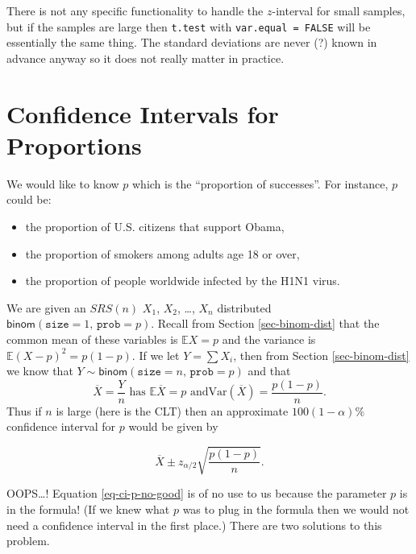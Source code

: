 \documentclass[]{book}
\providecommand{\tightlist}{%
  \setlength{\itemsep}{0pt}\setlength{\parskip}{0pt}}
\numberwithin{equation}{chapter}
\numberwithin{figure}{chapter}
\theoremstyle{plain}
\theoremstyle{definition}
\theoremstyle{remark}
\theoremstyle{definition}
\theoremstyle{definition}
\theoremstyle{remark}
\begin{document}
There is not any specific functionality to handle the \(z\)-interval for
small samples, but if the samples are large then \texttt{t.test} with
\texttt{var.equal\ =\ FALSE} will be essentially the same thing. The
standard deviations are never (?) known in advance anyway so it does not
really matter in practice.

\section{Confidence Intervals for
Proportions}\label{sec-confidence-intervals-proportions}

We would like to know \(p\) which is the ``proportion of successes''.
For instance, \(p\) could be:

\begin{itemize}
\tightlist
\item
  the proportion of U.S. citizens that support Obama,
\item
  the proportion of smokers among adults age 18 or over,
\item
  the proportion of people worldwide infected by the H1N1 virus.
\end{itemize}

We are given an \(SRS(n)\) \(X_{1}\), \(X_{2}\), \ldots{}, \(X_{n}\)
distributed \(\mathsf{binom}(\mathtt{size}=1,\,\mathtt{prob}=p)\).
Recall from Section \ref{sec-binom-dist} that the common mean of these
variables is \(\mathbb{E} X=p\) and the variance is
\(\mathbb{E}(X-p)^{2}=p(1-p)\). If we let \(Y=\sum X_{i}\), then from
Section \ref{sec-binom-dist} we know that
\(Y\sim\mathsf{binom}(\mathtt{size}=n,\,\mathtt{prob}=p)\) and that \[
\overline{X}=\frac{Y}{n}\mbox{ has }\mathbb{E}\overline{X}=p\mbox{ and
}\mathrm{Var}(\overline{X})=\frac{p(1-p)}{n}.  \] Thus if \(n\) is large
(here is the CLT) then an approximate \(100(1-\alpha)\%\) confidence
interval for \(p\) would be given by

\begin{equation}
\label{eq-ci-p-no-good}
\overline{X}\pm z_{\alpha/2}\sqrt{\frac{p(1-p)}{n}}.
\end{equation}

OOPS\ldots{}! Equation \eqref{eq-ci-p-no-good} is of no use to us
because the  parameter \(p\) is in the formula! (If we
knew what \(p\) was to plug in the formula then we would not need a
confidence interval in the first place.) There are two solutions to this
problem.
\end{document}
